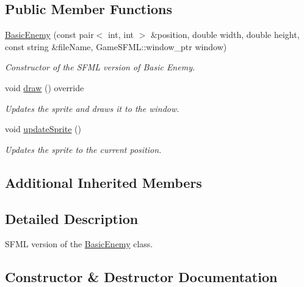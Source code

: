 \subsection*{Public Member Functions}
\begin{DoxyCompactItemize}
\item 
\hyperlink{classGameSFML_1_1BasicEnemy_a33fe286fc3101188696952c84f6a0592}{Basic\+Enemy} (const pair$<$ int, int $>$ \&position, double width, double height, const string \&file\+Name, Game\+S\+F\+M\+L\+::window\+\_\+ptr window)
\begin{DoxyCompactList}\small\item\em Constructor of the S\+F\+ML version of Basic Enemy. \end{DoxyCompactList}\item 
void \hyperlink{classGameSFML_1_1BasicEnemy_a1062ddf1321edb7d069b68b396615626}{draw} () override
\begin{DoxyCompactList}\small\item\em Updates the sprite and draws it to the window. \end{DoxyCompactList}\item 
void \hyperlink{classGameSFML_1_1BasicEnemy_abd16a66e14ffd7067f6e397290a82198}{update\+Sprite} ()
\begin{DoxyCompactList}\small\item\em Updates the sprite to the current position. \end{DoxyCompactList}\end{DoxyCompactItemize}
\subsection*{Additional Inherited Members}


\subsection{Detailed Description}
S\+F\+ML version of the \hyperlink{classGameSFML_1_1BasicEnemy}{Basic\+Enemy} class. 

\subsection{Constructor \& Destructor Documentation}
\mbox{\label{classGameSFML_1_1BasicEnemy_a33fe286fc3101188696952c84f6a0592}} 
